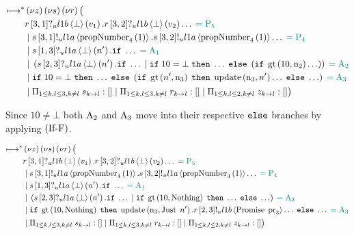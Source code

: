 \begin{align*}
\mapstostar&
\NuChannels \big (\\
&\ReceiveUnreliableP{\ChannelR}{3}{1}{\LOneB}{\bot}{v_1}.\ReceiveUnreliableP{\ChannelR}{3}{2}{\LOneB}{\bot}{v_2}\ldots \comment{= \Proposer{5}}\\
&\Or  \SendUnreliableP{\ChannelS}{3}{1}{\LOneA}{\proposalNumber{1}{4}}.\SendUnreliableP{\ChannelS}{3}{2}{\LOneA}{\proposalNumber{1}{4}}\ldots \comment{= \Proposer{4}}\\
&\Or  \ReceiveUnreliableP{\ChannelS}{1}{3}{\LOneA}{\bot}{n'}.\If \ldots \comment{=\Acceptor{1}}\\
&\Or
    \Paren{
        \ReceiveUnreliableP{\ChannelS}{2}{3}{\LOneA}{\bot}{n'}.\If \ldots
        \Or
            \If 10 = \bot
            \;\Then \ldots
            \;\Else \Paren{
                \If \greaterThan{10}{\NumberRegister_2} \ldots
                }
    } \comment{=\Acceptor{2}}\\
&\Or \If 10 = \bot
        \;\Then \ldots
        \;\Else \Paren{
            \If \greaterThan{n'}{\NumberRegister_3}
            \;\Then \update{\NumberRegister_3}{n'}\ldots
            \;\Else \ldots
        } \comment{=\Acceptor{3}}\\
&\Or \InnerSessionQueues{\ChannelS}
\Or \InnerSessionQueues{\ChannelR}
\Or \OuterSessionQueues
\big )
\end{align*}

Since $10 \neq \bot$ both $\Acceptor{2}$ and $\Acceptor{3}$ move into their respective $\ElseName$ branches by applying $\RIfF$.

\begin{align*}
\mapstostar& \NuChannels \big (\\
&\ReceiveUnreliableP{\ChannelR}{3}{1}{\LOneB}{\bot}{v_1}.\ReceiveUnreliableP{\ChannelR}{3}{2}{\LOneB}{\bot}{v_2}\ldots \comment{= \Proposer{5}}\\
&\Or \SendUnreliableP{\ChannelS}{3}{1}{\LOneA}{\proposalNumber{1}{4}}.\SendUnreliableP{\ChannelS}{3}{2}{\LOneA}{\proposalNumber{1}{4}}\ldots \comment{= \Proposer{4}}\\
&\Or \ReceiveUnreliableP{\ChannelS}{1}{3}{\LOneA}{\bot}{n'}.\If \ldots \comment{=\Acceptor{1}}\\
&\Or \Paren{
    \ReceiveUnreliableP{\ChannelS}{2}{3}{\LOneA}{\bot}{n'}.\If \ldots
    \Or
    \If \greaterThan{10}{\Nothing}
    \;\Then \ldots
    \;\Else \ldots
} \comment{=\Acceptor{2}}\\
&\Or
    \If \greaterThan{10}{\Nothing}
    \;\Then
        \update{\NumberRegister_3}{\Just{n'}}.
        \SendUnreliableP{\ChannelR}{2}{3}{\LOneB}{\Promise{\ProposalRegister_3}}\ldots
    \;\Else \ldots
    \comment{=\Acceptor{3}}\\
&\Or \InnerSessionQueues{\ChannelS}
\Or \InnerSessionQueues{\ChannelR}
\Or \OuterSessionQueues
\big )
\end{align*}

